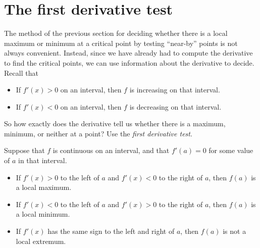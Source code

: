 \documentclass{ximera}
\begin{document}
\begin{example}
\begin{explanation}
\begin{image}
\end{image}
\end{explanation}
\end{example}






\section{The first derivative test}

The method of the previous section for deciding whether there is a
local maximum or minimum at a critical point by testing ``near-by''
points is not always convenient. Instead, since we have already had to
compute the derivative to find the critical points, we can use
information about the derivative to decide. Recall that
\begin{itemize}
\item If $f'(x) >0$ on an interval, then $f$ is increasing on that interval.
\item If $f'(x) <0$ on an interval, then $f$ is decreasing on that interval.
\end{itemize}

So how exactly does the derivative tell us whether there is a maximum,
minimum, or neither at a point? Use the \textit{first derivative test}.

\begin{theorem}\label{T:fdt}\hfil
Suppose that $f$ is continuous on an interval, and that $f'(a)=0$ for
some value of $a$ in that interval.
\begin{itemize}
\item If $f'(x)>0$ to the left of $a$ and $f'(x)<0$ to the right of
  $a$, then $f(a)$ is a local maximum.
\item If $f'(x)<0$ to the left of $a$ and $f'(x)>0$ to the right of
  $a$, then $f(a)$ is a local minimum.
\item If $f'(x)$ has the same sign to the left and right of $a$,
  then $f(a)$ is not a local extremum.
\end{itemize}
\end{theorem}
\end{document}

